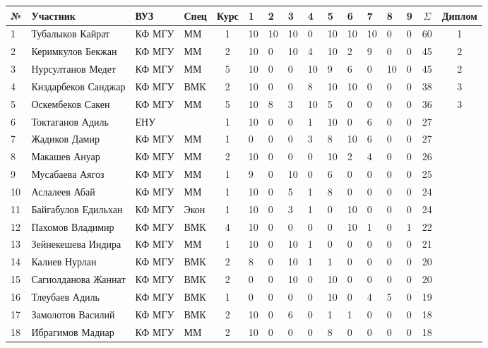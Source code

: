 \begin{center}
\begin{tabular}{|l|l|l|l|c|*{9}{p{0.3cm}|}c|c|}
\hline
№ & Участник & ВУЗ & Спец & Курс & 1 & 2 & 3 & 4 & 5 & 6 & 7 & 8 & 9 & $\Sigma$ & Диплом\\
\hline
1 & Тубалыков Кайрат & КФ МГУ & ММ & 1 & 10 & 10 & 10 & 0 & 10 & 10 & 10 & 0 & 0 & 60 & 1\\
\hline
2 & Керимкулов Бекжан & КФ МГУ & ММ & 2 & 10 & 0 & 10 & 4 & 10 & 2 & 9 & 0 & 0 & 45 & 2\\
\hline
3 & Нурсултанов Медет & КФ МГУ & ММ & 5 & 10 & 0 & 0 & 10 & 9 & 6 & 0 & 10 & 0 & 45 & 2\\
\hline
4 & Киздарбеков Санджар & КФ МГУ & ВМК & 2 & 10 & 0 & 0 & 8 & 10 & 10 & 0 & 0 & 0 & 38 & 3\\
\hline
5 & Оскембеков Сакен & КФ МГУ & ММ & 5 & 10 & 8 & 3 & 10 & 5 & 0 & 0 & 0 & 0 & 36 & 3\\
\hline
6 & Токтаганов Адиль & ЕНУ & & 1 & 10 & 0 & 0 & 1 & 10 & 0 & 6 & 0 & 0 & 27 & \\
\hline
7 & Жадиков Дамир & КФ МГУ & ММ & 1 & 0 & 0 & 0 & 3 & 8 & 10 & 6 & 0 & 0 & 27 & \\
\hline
8 & Макашев Ануар & КФ МГУ & ММ & 2 & 10 & 0 & 0 & 0 & 10 & 2 & 4 & 0 & 0 & 26 & \\
\hline
9 & Мусабаева Аягоз & КФ МГУ & ММ & 1 & 9 & 0 & 10 & 0 & 6 & 0 & 0 & 0 & 0 & 25 & \\
\hline
10 & Аслалеев Абай & КФ МГУ & ММ & 1 & 10 & 0 & 5 & 1 & 8 & 0 & 0 & 0 & 0 & 24 & \\
\hline
11 & Байгабулов Едильхан & КФ МГУ & Экон & 1 & 10 & 0 & 3 & 1 & 0 & 10 & 0 & 0 & 0 & 24 & \\
\hline
12 & Пахомов Владимир & КФ МГУ & ВМК & 4 & 10 & 0 & 0 & 0 & 0 & 10 & 1 & 0 & 1 & 22 & \\
\hline
13 & Зейнекешева Индира & КФ МГУ & ММ & 1 & 10 & 0 & 10 & 1 & 0 & 0 & 0 & 0 & 0 & 21 & \\
\hline
14 & Калиев Нурлан & КФ МГУ & ВМК & 2 & 8 & 0 & 10 & 1 & 1 & 0 & 0 & 0 & 0 & 20 & \\
\hline
15 & Сагиолданова Жаннат & КФ МГУ & ВМК & 2 & 0 & 0 & 10 & 0 & 10 & 0 & 0 & 0 & 0 & 20 & \\
\hline
16 & Тлеубаев Адиль & КФ МГУ & ВМК & 1 & 0 & 0 & 0 & 0 & 10 & 0 & 4 & 5 & 0 & 19 & \\
\hline
17 & Замолотов Василий & КФ МГУ & ВМК & 2 & 10 & 0 & 6 & 0 & 1 & 1 & 0 & 0 & 0 & 18 & \\
\hline
18 & Ибрагимов Мадиар & КФ МГУ & ММ & 2 & 10 & 0 & 0 & 0 & 8 & 0 & 0 & 0 & 0 & 18 & \\

\end{tabular}
\end{center}
